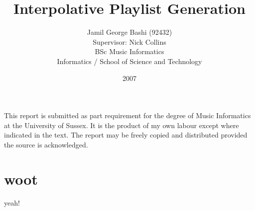 \documentclass[a4paper]{book}
\title{Interpolative Playlist Generation}
\author{Jamil George Bashi (92432)\\
\small Supervisor: Nick Collins\\[2cm]
\large BSc Music Informatics\\
\small Informatics / School of Science and Technology}
\date{\Large 2007}
\begin{document}
\pagestyle{empty}
\begin{titlepage}
\maketitle
\end{titlepage}
\cleardoublepage
This report is submitted as part requirement for the degree of Music Informatics
at the University of Sussex. It is the product of my own labour except where
indicated in the text. The report may be freely copied and distributed
provided the source is acknowledged.\\[3cm]
\hrulefill
\cleardoublepage
\tableofcontents
\cleardoublepage
\pagestyle{headings}
\section{woot}
yeah!
\end{document}
